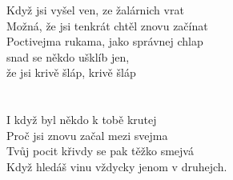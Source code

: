 \begin{multicols}{2}
\singlespacing

\sloka
Když jsi vyšel ven, ze žalárnich vrat\\
Možná, že jsi tenkrát chtěl znovu začínat\\
Poctivejma rukama, jako správnej chlap\\
snad se někdo ušklíb jen,\\
že jsi krivě šláp, krivě šláp\\
\\
\\

\sloka
I když byl někdo k tobě krutej\\
Proč jsi znovu začal mezi svejma\\
Tvůj pocit křivdy se pak těžko smejvá\\
Když hledáš vinu vždycky jenom v druhejch.\\


\end{multicols}